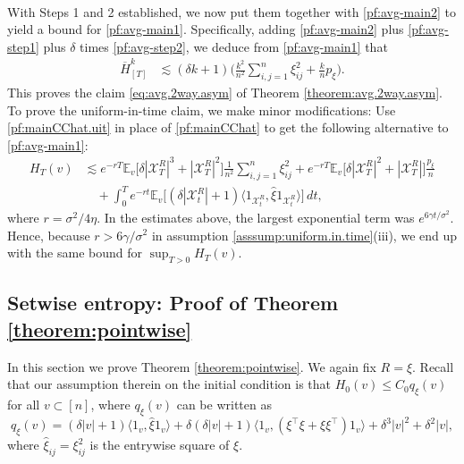 \documentclass[11pt,reqno]{amsart}
\numberwithin{equation}{section}
\theoremstyle{definition}
\def\E{{\mathbb E}}
\def\X{{\mathcal X}}
\begin{document}
{ \ }

With Steps 1 and 2 established, we now put them together with \eqref{pf:avg-main2} to yield a bound for \eqref{pf:avg-main1}. Specifically, adding \eqref{pf:avg-main2} plus \eqref{pf:avg-step1} plus $\delta$ times \eqref{pf:avg-step2}, we deduce from \eqref{pf:avg-main1} that
\begin{align*}
  \overline{H}^k_{[T]}  &\lesssim (\delta k+1)\bigg(\frac{k^2}{n^2}\sum_{i,j=1}^n\xi_{ij}^2 + \frac{k}{n}p_\xi\bigg).
\end{align*}
This proves the claim \eqref{eq:avg.2way.asym} of Theorem \ref{theorem:avg.2way.asym}. To prove the uniform-in-time claim, we make minor modifications: Use \eqref{pf:mainCChat.uit} in place of \eqref{pf:mainCChat} to get the following alternative to \eqref{pf:avg-main1}:
\begin{equation*}
\begin{split}
H_T(v) & \lesssim e^{-rT}\E_v\big[ \delta |\X_T^{R}|^3+|\X_T^{R}|^2\big]\frac{1}{n^2}\sum_{i,j=1}^n\xi_{ij}^2 + e^{-rT}\E_v\big[\delta |\X_T^{R}|^2 + |\X_T^{R}|\big]\frac{p_\xi}{n} \\
	&\quad + \int_0^T e^{-rt}\E_v\big[(\delta |\X_t^{R}|+1) \langle 1_{\X_t^{R}}, \widehat{\xi} 1_{\X_t^{R}}\rangle  \big]\,dt,
\end{split}  
\end{equation*}
where $r=\sigma^2/4\eta$.
In the estimates above,  the largest exponential term was $e^{6\gamma t/\sigma^2}$. Hence, because $r > 6\gamma/\sigma^2$ in assumption \ref{asssump:uniform.in.time}(iii),  we end up with the same bound for $\sup_{T > 0}H_T(v)$. \hfill \qedsymbol

\subsection{Setwise entropy: Proof of Theorem \ref{theorem:pointwise}}

In this section we prove Theorem \ref{theorem:pointwise}. We again fix $R = \xi$.  Recall that our assumption therein on the initial condition is that $H_0(v) \le C_0 q_\xi(v)$ for all $v \subset [n]$, where $q_\xi(v)$ can be written as
\begin{equation}
	q_\xi(v) = (\delta|v|+1)\langle 1_v, \widehat{\xi} 1_v\rangle + \delta (\delta|v|+1)\langle 1_v, (\xi^\top \xi + \xi\xi^\top) 1_v\rangle + \delta^3|v|^2  +\delta^2|v| , \label{def:qxi-rewrite}
\end{equation}
where $\widehat{\xi}_{ij}=\xi_{ij}^2$ is the entrywise square of $\xi$.
\end{document}
